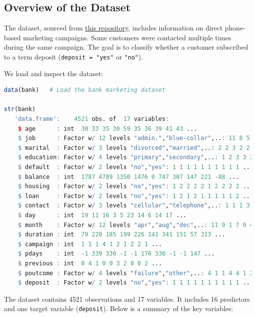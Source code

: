 \documentclass[
]{book}
\newcommand{\passthrough}[1]{#1}
\theoremstyle{definition}
\theoremstyle{definition}
\theoremstyle{definition}
\theoremstyle{definition}
\theoremstyle{remark}
\begin{document}
\subsection*{Overview of the Dataset}\label{overview-of-the-dataset-3}

The dataset, sourced from \href{https://rdrr.io/cran/liver/man/bank.html}{this repository}, includes information on direct phone-based marketing campaigns. Some customers were contacted multiple times during the same campaign. The goal is to classify whether a customer subscribed to a term deposit (\passthrough{\lstinline!deposit = "yes"!} or \passthrough{\lstinline!"no"!}).

We load and inspect the dataset:

\begin{lstlisting}[language=R]
data(bank)   # Load the bank marketing dataset 

str(bank)
   'data.frame':    4521 obs. of  17 variables:
    $ age      : int  30 33 35 30 59 35 36 39 41 43 ...
    $ job      : Factor w/ 12 levels "admin.","blue-collar",..: 11 8 5 5 2 5 7 10 3 8 ...
    $ marital  : Factor w/ 3 levels "divorced","married",..: 2 2 3 2 2 3 2 2 2 2 ...
    $ education: Factor w/ 4 levels "primary","secondary",..: 1 2 3 3 2 3 3 2 3 1 ...
    $ default  : Factor w/ 2 levels "no","yes": 1 1 1 1 1 1 1 1 1 1 ...
    $ balance  : int  1787 4789 1350 1476 0 747 307 147 221 -88 ...
    $ housing  : Factor w/ 2 levels "no","yes": 1 2 2 2 2 1 2 2 2 2 ...
    $ loan     : Factor w/ 2 levels "no","yes": 1 2 1 2 1 1 1 1 1 2 ...
    $ contact  : Factor w/ 3 levels "cellular","telephone",..: 1 1 1 3 3 1 1 1 3 1 ...
    $ day      : int  19 11 16 3 5 23 14 6 14 17 ...
    $ month    : Factor w/ 12 levels "apr","aug","dec",..: 11 9 1 7 9 4 9 9 9 1 ...
    $ duration : int  79 220 185 199 226 141 341 151 57 313 ...
    $ campaign : int  1 1 1 4 1 2 1 2 2 1 ...
    $ pdays    : int  -1 339 330 -1 -1 176 330 -1 -1 147 ...
    $ previous : int  0 4 1 0 0 3 2 0 0 2 ...
    $ poutcome : Factor w/ 4 levels "failure","other",..: 4 1 1 4 4 1 2 4 4 1 ...
    $ deposit  : Factor w/ 2 levels "no","yes": 1 1 1 1 1 1 1 1 1 1 ...
\end{lstlisting}

The dataset contains 4521 observations and 17 variables. It includes 16 predictors and one target variable (\passthrough{\lstinline!deposit!}). Below is a summary of the key variables:
\end{document}
